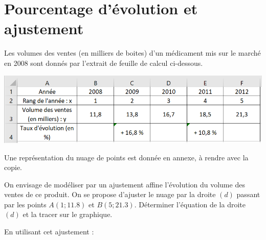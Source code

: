 \section{Pourcentage d'évolution et ajustement}

Les volumes des ventes (en milliers de boites) d'un médicament mis sur le marché en 2008 sont donnés par l'extrait de feuille de calcul ci-dessous.

\begin{center}
	\includegraphics[scale=0.4]{tab}
\end{center}

Une représentation du nuage de points est donnée en annexe, à rendre avec la copie.

\begin{questions}
	\question 
	
	\question On envisage de modéliser par un ajustement affine l'évolution du volume des ventes de ce produit. On se propose d'ajuster le nuage par la droite $(d)$ passant par les points  $A(1;\num{11.8})$ et $B(5;\num{21.3})$. Déterminer l'équation de la droite $(d)$ et la tracer sur le graphique.
		
	
	\question En utilisant cet ajustement :
\end{questions}

